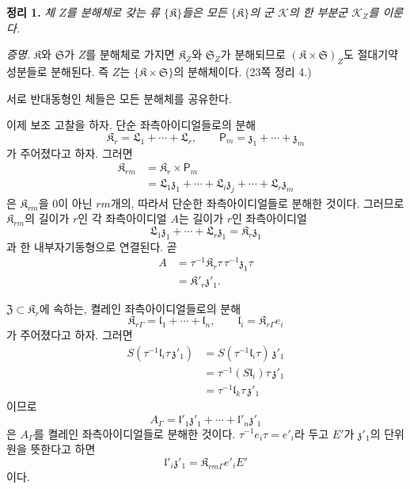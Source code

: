 \textbf{정리 1.} \emph{체 \(Z\)를 분해체로 갖는 류 \(\{\mathfrak K\}\)들은 모든 \(\{\mathfrak K\}\)의 군 \(\mathscr K\)의 한 부분군 \(\mathscr K_Z\)를 이룬다.}

\emph{증명.} \(\mathfrak K\)와 \(\mathfrak S\)가 \(Z\)를 분해체로 가지면 \(\mathfrak K_Z\)와 \(\mathfrak S_Z\)가 분해되므로 \((\mathfrak K\times\mathfrak S)_Z\)도 절대기약 성분들로 분해된다. 즉 \(Z\)는 \(\{\mathfrak K\times\mathfrak S\}\)의 분해체이다. (23쪽 정리 4.)

서로 반대동형인 체들은 모든 분해체를 공유한다.

이제 보조 고찰을 하자. 단순 좌측아이디얼들로의 분해
\[
        \mathfrak K_r
        =\mathfrak L_1+\cdots+\mathfrak L_r,
        \qquad
        \mathsf P_m
        =\mathfrak z_1+\cdots+\mathfrak z_m
\]
가 주어졌다고 하자. 그러면
\[
\begin{aligned}
\mathfrak K_{rm}
 &=\mathfrak K_r\times\mathsf P_m\\
 &=\mathfrak L_1\mathfrak z_1+
   \cdots+
   \mathfrak L_i\mathfrak z_j+
   \cdots+
   \mathfrak L_r\mathfrak z_m
\end{aligned}
\]
은 \(\mathfrak K_{rm}\)을 \(0\)이 아닌 \(rm\)개의, 따라서 단순한 좌측아이디얼들로 분해한 것이다. 그러므로 \(\mathfrak K_{rm}\)의 길이가 \(r\)인 각 좌측아이디얼 \(A\)는 길이가 \(r\)인 좌측아이디얼
\[
        \mathfrak L_1\mathfrak z_1+
        \cdots+
        \mathfrak L_r\mathfrak z_1
        =\mathfrak K_r\mathfrak z_1
\]
과 한 내부자기동형으로 연결된다. 곧
\[
\begin{aligned}
A
 &=\tau^{-1}\mathfrak K_r\tau\,
   \tau^{-1}\mathfrak z_1\tau\\
 &=\mathfrak K'_r\mathfrak z'_1.
\end{aligned}
\]

\(\mathfrak Z\subset\mathfrak K_r\)에 속하는, 켤레인 좌측아이디얼들로의 분해
\[
        \mathfrak K_{r\Gamma}
        =\mathfrak l_1+\cdots+\mathfrak l_n,
        \qquad
        \mathfrak l_i=\mathfrak K_{r\Gamma}e_i
\]
가 주어졌다고 하자. 그러면
\[
\begin{aligned}
S(\tau^{-1}\mathfrak l_i\tau\,\mathfrak z'_1)
 &=S(\tau^{-1}\mathfrak l_i\tau)\,\mathfrak z'_1\\
 &=\tau^{-1}(S\mathfrak l_i)\tau\,\mathfrak z'_1\\
 &=\tau^{-1}\mathfrak l_k\tau\,\mathfrak z'_1
\end{aligned}
\]
이므로
\[
\tag{1}
        A_\Gamma
        =\mathfrak l'_1\mathfrak z'_1+
         \cdots+
         \mathfrak l'_n\mathfrak z'_1
\]
은 \(A_\Gamma\)를 켤레인 좌측아이디얼들로 분해한 것이다. \(\tau^{-1}e_i\tau=e'_i\)라 두고 \(E'\)가 \(\mathfrak z'_1\)의 단위원을 뜻한다고 하면
\[
        \mathfrak l'_i\mathfrak z'_1
        =\mathfrak K_{rm\Gamma}e'_iE'
\]
이다.

